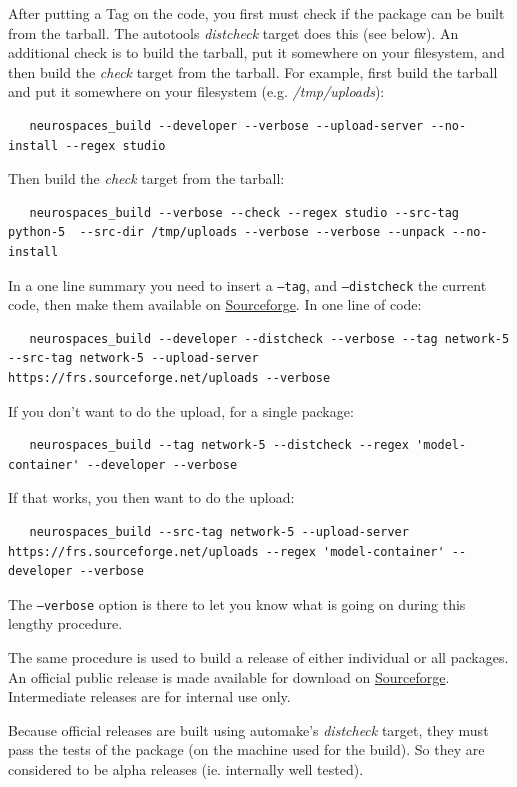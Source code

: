 \documentclass[12pt]{article}
\begin{document}
After putting a Tag on the code, you first must check if the package can be built from the tarball. The autotools {\it distcheck} target does this (see below). An additional check is to build the tarball, put it somewhere on your filesystem, and then build the {\it check} target from the tarball. For example, first build the tarball and put it somewhere on your filesystem (e.g. {\it /tmp/uploads}):
\begin{verbatim}
   neurospaces_build --developer --verbose --upload-server --no-install --regex studio
\end{verbatim}
Then build the {\it check} target from the tarball:
\begin{verbatim}
   neurospaces_build --verbose --check --regex studio --src-tag python-5  --src-dir /tmp/uploads --verbose --verbose --unpack --no-install
\end{verbatim}
In a one line summary you need to insert a {\tt --tag}, and {\tt --distcheck} the current code, then make them available on \href{http://sourceforge.net/projects/neurospaces/}{Sourceforge}. In one line of code:
\begin{verbatim}
   neurospaces_build --developer --distcheck --verbose --tag network-5 --src-tag network-5 --upload-server https://frs.sourceforge.net/uploads --verbose
\end{verbatim}
If you don't want to do the upload, for a single package:
\begin{verbatim}
   neurospaces_build --tag network-5 --distcheck --regex 'model-container' --developer --verbose
\end{verbatim}
If that works, you then want to do the upload:
\begin{verbatim}
   neurospaces_build --src-tag network-5 --upload-server https://frs.sourceforge.net/uploads --regex 'model-container' --developer --verbose
\end{verbatim}
The {\tt --verbose} option is there to let you know what is going on during this lengthy procedure.

The same procedure is used to build a release of either individual or all packages. An official public release is made available for download on \href{http://sourceforge.net/projects/neurospaces/}{Sourceforge}. Intermediate releases are for internal use only.

Because official releases are built using automake's {\it distcheck} target, they must pass the tests of the package (on the machine used for the build). So they are considered to be alpha releases (ie. internally well tested).
\end{document}

